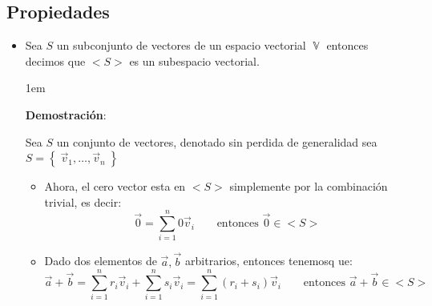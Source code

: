 \documentclass[12pt, fleqn]{report}                             %
\newenvironment{SmallIndentation}[1][0.75em]                    %
        {\begin{adjustwidth}{#1}{}\begin{footnotesize}}             %
        {\end{footnotesize}\end{adjustwidth}}                       %
\DeclareMathOperator \Space {\quad}                             %
\theoremstyle{break}                                            %
\DeclareMathOperator \VectorSet    {\mathbb{V}}                 %
\newcommand{\Set}[1]    {\left\{ \; #1 \; \right\}}             %
\begin{document}
            \subsection{Propiedades}

                \begin{itemize}
                    \item 
                        Sea $S$ un subconjunto de vectores de un espacio vectorial $\VectorSet$ entonces
                        decimos que $<S>$ es un subespacio vectorial.

                        \begin{SmallIndentation}[1em]
                            \textbf{Demostración}:
                            
                            Sea $S$ un conjunto de vectores, denotado sin perdida de generalidad
                            sea $S = \Set{\vec v_1, \dots, \vec v_n}$

                            \begin{itemize}
                                \item
                                    Ahora, el cero vector esta en $<S>$ simplemente por la combinación
                                    trivial, es decir:
                                    \begin{equation*}
                                        \vec 0 = \sum_{i = 1}^n 0 \vec v_i
                                        \Space \text{ entonces } \vec 0 \in <S>
                                    \end{equation*}

                                \item
                                    Dado dos elementos de $\vec a, \vec b$ arbitrarios, entonces tenemosq ue:
                                    \begin{equation*}
                                        \vec a + \vec b 
                                            = \sum_{i = 1}^n r_i \vec v_i + \sum_{i = 1}^n s_i \vec v_i
                                            = \sum_{i = 1}^n (r_i + s_i) \vec v_i
                                            \Space \text{ entonces } \vec a + \vec b \in <S>
                                    \end{equation*}


\end{itemize}
\end{SmallIndentation}
\end{itemize}
\end{document}
